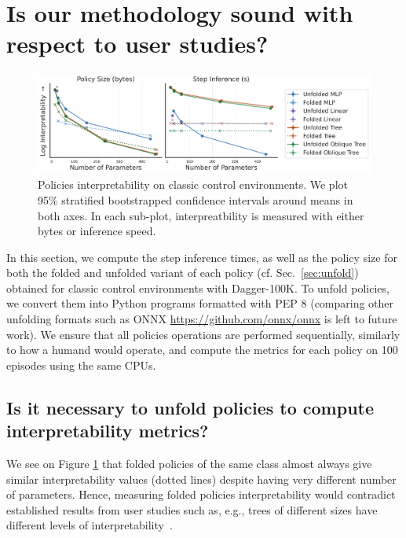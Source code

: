 \section{Is our methodology sound with respect to user studies?}

\begin{figure}
    \centering
    \includegraphics[width=1\linewidth]{images/images_part3/tree_sizes_memory_ppo_ci_ablation.pdf}
    \caption{Policies interpretability on classic control environments. We plot 95\% stratified bootstrapped confidence intervals around means in both axes. In each sub-plot, interpreatbility is measured with either bytes or inference speed.}
    \label{fig:abl-proxies}
\end{figure}

In this section, we compute the step inference times, as well as the policy size for both the folded and unfolded variant of each policy (cf. Sec.~\ref{sec:unfold}) obtained for classic control environments with Dagger-100K.
To unfold policies, we convert them into Python programs formatted with PEP 8 (comparing other unfolding formats such as ONNX \url{https://github.com/onnx/onnx} is left to future work).
We ensure that all policies operations are performed sequentially, similarly to how a humand would operate, and compute the metrics for each policy on 100 episodes using the same CPUs.

\subsection{Is it necessary to unfold policies to compute interpretability metrics?}
We see on Figure \ref{fig:abl-proxies} that folded policies of the same class almost always give similar interpretability values (dotted lines) despite having very different number of parameters.
Hence, measuring folded policies interpretability would contradict established results from user studies such as, e.g., trees of different sizes have different levels of interpretability~\cite{study-4}. 

